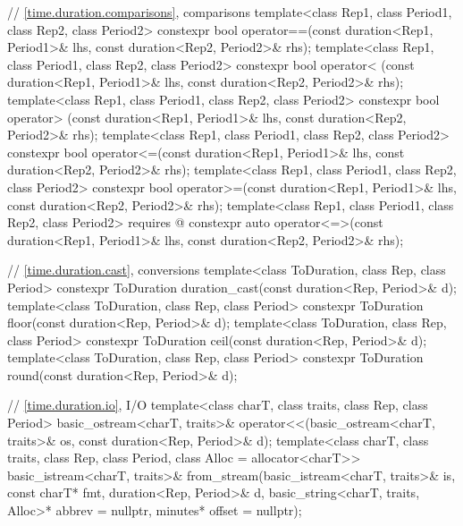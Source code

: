 \begin{codeblock}
{{    // \ref{time.duration.comparisons},  comparisons
    template<class Rep1, class Period1, class Rep2, class Period2>
      constexpr bool operator==(const duration<Rep1, Period1>& lhs,
                                const duration<Rep2, Period2>& rhs);
    template<class Rep1, class Period1, class Rep2, class Period2>
      constexpr bool operator< (const duration<Rep1, Period1>& lhs,
                                const duration<Rep2, Period2>& rhs);
    template<class Rep1, class Period1, class Rep2, class Period2>
      constexpr bool operator> (const duration<Rep1, Period1>& lhs,
                                const duration<Rep2, Period2>& rhs);
    template<class Rep1, class Period1, class Rep2, class Period2>
      constexpr bool operator<=(const duration<Rep1, Period1>& lhs,
                                const duration<Rep2, Period2>& rhs);
    template<class Rep1, class Period1, class Rep2, class Period2>
      constexpr bool operator>=(const duration<Rep1, Period1>& lhs,
                                const duration<Rep2, Period2>& rhs);
    template<class Rep1, class Period1, class Rep2, class Period2>
      requires @\seebelow@
      constexpr auto operator<=>(const duration<Rep1, Period1>& lhs,
                                 const duration<Rep2, Period2>& rhs);

    // \ref{time.duration.cast}, conversions
    template<class ToDuration, class Rep, class Period>
      constexpr ToDuration duration_cast(const duration<Rep, Period>& d);
    template<class ToDuration, class Rep, class Period>
      constexpr ToDuration floor(const duration<Rep, Period>& d);
    template<class ToDuration, class Rep, class Period>
      constexpr ToDuration ceil(const duration<Rep, Period>& d);
    template<class ToDuration, class Rep, class Period>
      constexpr ToDuration round(const duration<Rep, Period>& d);

    // \ref{time.duration.io},  I/O
    template<class charT, class traits, class Rep, class Period>
      basic_ostream<charT, traits>&
        operator<<(basic_ostream<charT, traits>& os,
                   const duration<Rep, Period>& d);
    template<class charT, class traits, class Rep, class Period, class Alloc = allocator<charT>>
      basic_istream<charT, traits>&
        from_stream(basic_istream<charT, traits>& is, const charT* fmt,
                    duration<Rep, Period>& d,
                    basic_string<charT, traits, Alloc>* abbrev = nullptr,
                    minutes* offset = nullptr);

}}
\end{codeblock}
